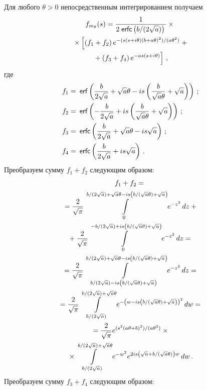 \begin{multicols}{2}
Для любого $\theta > 0$ непосредственным интегрированием получаем
\begin{multline*}
f_{m_{\theta}}(s) = \displaystyle\frac{\displaystyle 1\mathstrut}{\displaystyle 2\;{\sf erfc}\left(b/(2\sqrt{a})\right)\mathstrut}\times{}\\
{}\times
\left[\left(f_1 + f_2\right)e^{-({s(s + i\theta)(b + a\theta)^2})/({a\theta^2})}\;+ \right.\\
\left.{}+\left(f_3 + f_4\right)e^{-as(s+ i\theta)}\right]\,,
\end{multline*}
где
\begin{align*}
f_1 &= \:{\sf erf}\left(\displaystyle\frac{\displaystyle b\mathstrut}{\displaystyle {2\sqrt{a}}\mathstrut}+ \sqrt{a}\theta - is\left(\displaystyle\frac{\displaystyle b\mathstrut}{\displaystyle \sqrt{a}\theta\mathstrut} + \sqrt{a}\right)\right)\,;
\\
f_2 &= \:{\sf erf}\left(-\displaystyle\frac{\displaystyle b\mathstrut}{\displaystyle {2\sqrt{a}}\mathstrut} + is\left(\displaystyle\frac{\displaystyle b\mathstrut}{\displaystyle \sqrt{a}\theta\mathstrut} + \sqrt{a}\right)\right)\,;\\
f_3 &= \:{\sf erfc}\left(\displaystyle\frac{\displaystyle b\mathstrut}{\displaystyle 2\sqrt{a}\mathstrut} + \sqrt{a}\theta - is\sqrt{a}\right)\,;\\
f_4 &= \:{\sf erfc}\left(\displaystyle\frac{\displaystyle b\mathstrut}{\displaystyle 2\sqrt{a}\mathstrut} + is\sqrt{a}\right)\,.
\end{align*}
Преобразуем сумму $f_1 + f_2$ следующим образом:
\begin{multline*}
f_1 + f_2 ={}\\
{}= \displaystyle\frac{\displaystyle 2\mathstrut}{\displaystyle \sqrt{\pi}\mathstrut} \int\limits_0^{{b}/({2\sqrt{a}}) + 
\sqrt{a}\theta - is\left({b}/({\sqrt{a}\theta}) + \sqrt{a}\right)} e^{-z^2}\,dz +{}\\
{}+
\displaystyle\frac{\displaystyle 2\mathstrut}{\displaystyle \sqrt{\pi}\mathstrut}\int\limits_0^{-b/(2\sqrt{a}) + is\left({b}/({\sqrt{a}\theta}) + 
\sqrt{a}\right)} e^{-z^2}\,dz ={}\\
{}
= \displaystyle\frac{\displaystyle 2\mathstrut}{\displaystyle \sqrt{\pi}\mathstrut} \int\limits_{{b}/({2\sqrt{a}}) - is\left({b}/({\sqrt{a}\theta}) + 
\sqrt{a}\right)}^{{b}/({2\sqrt{a}}) + \sqrt{a}\theta - is\left({b}/({\sqrt{a}\theta}) + \sqrt{a}\right)} 
e^{-z^2}\,dz ={}\\
{}= \displaystyle\frac{\displaystyle 2\mathstrut}{\displaystyle \sqrt{\pi}\mathstrut} \int\limits_{{b}/({2\sqrt{a}})}^{{b}/({2\sqrt{a}}) + 
\sqrt{a}\theta} e^{-\left(w - is\left({b}/({\sqrt{a}\theta}) + \sqrt{a}\right)\right)^2}\,dw ={}\\
{}
= \displaystyle\frac{\displaystyle 2\mathstrut}{\displaystyle \sqrt{\pi}\mathstrut} e^{({s^2(a\theta + b)^2})/({a\theta^2})} \times{}\\
{}\times \int\limits_{{b}/({2\sqrt{a}})}^{{b}/({2\sqrt{a}}) + \sqrt{a}\theta}
e^{-w^2} e^{2is\left(\sqrt{a}+ {b}/({\sqrt{a}\theta})\right)w}\, dw\,.
\end{multline*}
Преобразуем сумму $f_3 + f_4$ следующим образом:


\end{multicols}
